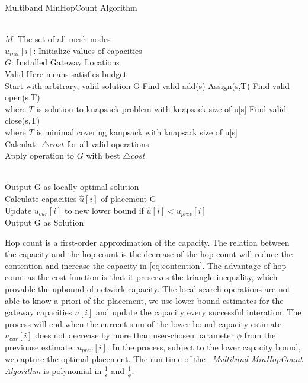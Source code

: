 	  \begin{algorithm}
          \small
	  \caption{Multiband MinHopCount Algorithm}
	  \label{algorithms: Minihop}
	  \begin{algorithmic}[1]
	  \REQUIRE  ~~\\
		 $M$: The set of all mesh nodes\\
		 $u_{init}[i]$: Initialize values of capacities
\ENSURE ~~\\    
$G$: Installed Gateway Locations \\
Valid Here means satisfies budget \\
Start with arbitrary, valid solution G
\STATE Find valid add(s)
\STATE Assign(s,T)
\STATE Find valid open(s,T) \\
where $T$ is solution to knapsack problem with knapsack size of u[s]
\STATE  Find valid close(s,T) \\
where $T$ is minimal covering kanpsack with knapsack size of u[s] \\
Calculate $\triangle cost$ for all valid operations\\
Apply operation to $G$ with best $\triangle cost$

\ENDWHILE
\\Output G as locally optimal solution\\
Calculate capacities $\hat{u}[i]$ of placement G\\
Update $u_{cur}[i]$ to new lower bound if $\hat{u}[i] < u_{prev}[i]$ \\
\ENDWHILE 
\ENDFOR
Output G as Solution
\end{algorithmic}
\end{algorithm}

      


	Hop count is a first-order approximation of the capacity. The relation between the capacity and the hop count is the decrease of the hop count will reduce the contention and increase the capacity in \ref{eq:contention}.
			The advantage of hop count as the cost function is that it preserves the triangle inequality, which provable the upbound of network capacity.
The local search operations are not able to know a priori of the placement, we use lower bound estimates for the gateway capacities $u[i]$ and update the capacity every successful interation.
The process will end when the current sum of the lower bound capacity estimate $u_{cur}[i]$ does not decrease by more than user-chosen parameter $\phi$ from the previouse estimate, $u_{prev}[i]$.
In the process, subject to the lower capacity bound, we capture the optimal placement. The run time of the ~\emph{Multiband MinHopCount Algorithm} is polynomial in $\frac{1}{\epsilon}$ and $\frac{1}{\phi}$.


